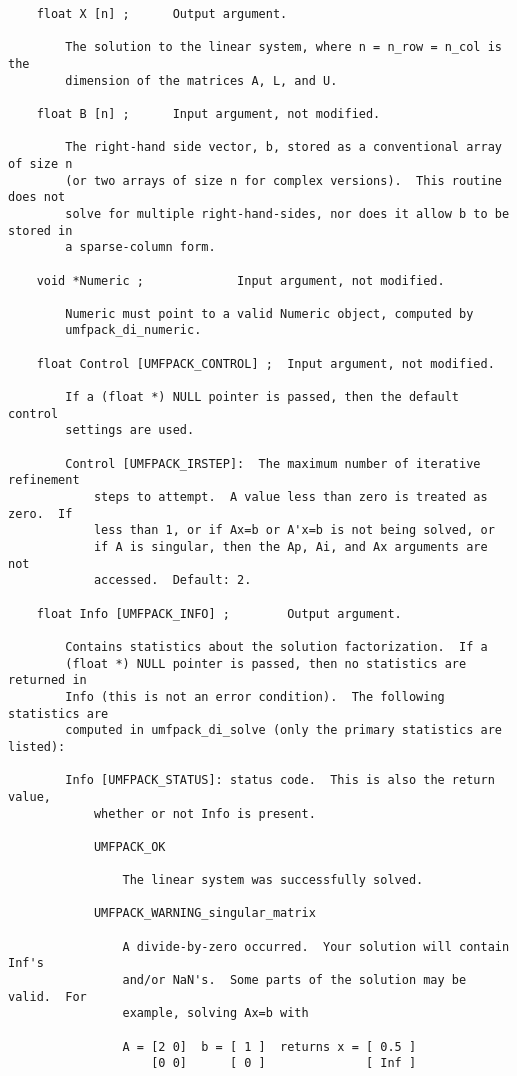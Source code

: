 \documentclass[11pt]{article}
\begin{document}
{\begin{verbatim}
    float X [n] ;      Output argument.

        The solution to the linear system, where n = n_row = n_col is the
        dimension of the matrices A, L, and U.

    float B [n] ;      Input argument, not modified.

        The right-hand side vector, b, stored as a conventional array of size n
        (or two arrays of size n for complex versions).  This routine does not
        solve for multiple right-hand-sides, nor does it allow b to be stored in
        a sparse-column form.

    void *Numeric ;             Input argument, not modified.

        Numeric must point to a valid Numeric object, computed by
        umfpack_di_numeric.

    float Control [UMFPACK_CONTROL] ;  Input argument, not modified.

        If a (float *) NULL pointer is passed, then the default control
        settings are used.

        Control [UMFPACK_IRSTEP]:  The maximum number of iterative refinement
            steps to attempt.  A value less than zero is treated as zero.  If
            less than 1, or if Ax=b or A'x=b is not being solved, or
            if A is singular, then the Ap, Ai, and Ax arguments are not
            accessed.  Default: 2.

    float Info [UMFPACK_INFO] ;        Output argument.

        Contains statistics about the solution factorization.  If a
        (float *) NULL pointer is passed, then no statistics are returned in
        Info (this is not an error condition).  The following statistics are
        computed in umfpack_di_solve (only the primary statistics are listed):

        Info [UMFPACK_STATUS]: status code.  This is also the return value,
            whether or not Info is present.

            UMFPACK_OK

                The linear system was successfully solved.

            UMFPACK_WARNING_singular_matrix

                A divide-by-zero occurred.  Your solution will contain Inf's
                and/or NaN's.  Some parts of the solution may be valid.  For
                example, solving Ax=b with

                A = [2 0]  b = [ 1 ]  returns x = [ 0.5 ]
                    [0 0]      [ 0 ]              [ Inf ]


\end{verbatim}}
\end{document}
